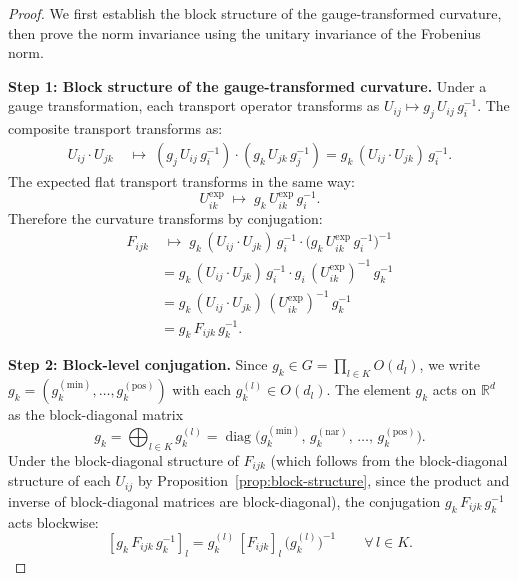 \begin{proof}
We first establish the block structure of the gauge-transformed curvature, then prove
the norm invariance using the unitary invariance of the Frobenius norm.

\medskip\noindent\textbf{Step 1: Block structure of the gauge-transformed curvature.}
Under a gauge transformation, each transport operator transforms as $U_{ij} \mapsto g_j\,
U_{ij}\, g_i^{-1}$. The composite transport transforms as:
\begin{align*}
    U_{ij} \cdot U_{jk}
    &\;\longmapsto\; (g_j\, U_{ij}\, g_i^{-1}) \cdot (g_k\, U_{jk}\, g_j^{-1})
    = g_k\, (U_{ij} \cdot U_{jk})\, g_i^{-1}.
\end{align*}
The expected flat transport transforms in the same way:
\[
    U_{ik}^{\exp} \;\longmapsto\; g_k\, U_{ik}^{\exp}\, g_i^{-1}.
\]
Therefore the curvature transforms by conjugation:
\begin{align*}
    F_{ijk}
    &\;\longmapsto\; g_k\, (U_{ij} \cdot U_{jk})\, g_i^{-1}
       \cdot \big(g_k\, U_{ik}^{\exp}\, g_i^{-1}\big)^{-1} \\
    &= g_k\, (U_{ij} \cdot U_{jk})\, g_i^{-1}
       \cdot g_i\, (U_{ik}^{\exp})^{-1}\, g_k^{-1} \\
    &= g_k\, (U_{ij} \cdot U_{jk})\, (U_{ik}^{\exp})^{-1}\, g_k^{-1} \\
    &= g_k\, F_{ijk}\, g_k^{-1}.
\end{align*}

\medskip\noindent\textbf{Step 2: Block-level conjugation.}
Since $g_k \in G = \prod_{l \in K} O(d_l)$, we write $g_k = (g_k^{(\mathrm{min})}, \ldots,
g_k^{(\mathrm{pos})})$ with each $g_k^{(l)} \in O(d_l)$. The element $g_k$ acts on
$\mathbb{R}^d$ as the block-diagonal matrix
\[
    g_k = \bigoplus_{l \in K} g_k^{(l)} = \operatorname{diag}\!\big(g_k^{(\mathrm{min})},\,
    g_k^{(\mathrm{nar})},\, \ldots,\, g_k^{(\mathrm{pos})}\big).
\]
Under the block-diagonal structure of $F_{ijk}$ (which follows from the block-diagonal
structure of each $U_{ij}$ by Proposition~\ref{prop:block-structure}, since the product
and inverse of block-diagonal matrices are block-diagonal), the conjugation $g_k\,
F_{ijk}\, g_k^{-1}$ acts blockwise:
\[
    [g_k\, F_{ijk}\, g_k^{-1}]_l = g_k^{(l)}\, [F_{ijk}]_l\, \big(g_k^{(l)}\big)^{-1}
    \qquad \forall\, l \in K.
\]


\end{proof}
